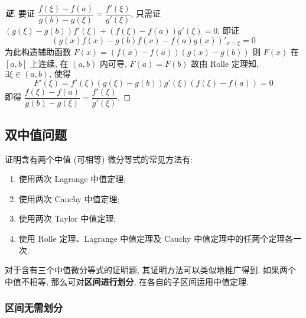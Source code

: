 \begin{proof}[{\songti \textbf{证}}]
    要证 $\dfrac{f(\xi)-f(a)}{g(b)-g(\xi)}=\dfrac{f'(\xi)}{g'(\xi)}$, 只需证 $(g(\xi)-g(b))f'(\xi)+(f(\xi)-f(a))g'(\xi)=0$, 
    即证 $$(g(x)f(x)-g(b)f(x)-f(a)g(x))'_{x=\xi}=0$$
    为此构造辅助函数 $F(x)=(f(x)-f(a))(g(x)-g(b))$ 则 $F(x)$ 在 $[a,b]$ 上连续, 在 $(a,b)$ 内可导, 
    $F(a)=F(b)$ 故由 Rolle 定理知, $\exists\xi\in(a,b)\text{, 使得 }$
    $$F'(\xi)=f'(\xi)(g(\xi)-g(b))g'(\xi)(f(\xi)-f(a))=0$$
    即得 $\dfrac{f(\xi)-f(a)}{g(b)-g(\xi)}=\dfrac{f'(\xi)}{g'(\xi)}.$
\end{proof}

\subsection{双中值问题}

证明含有两个中值 (可相等) 微分等式的常见方法有:
\begin{enumerate}[label=(\arabic{*})]
    \item 使用两次 Lagrange 中值定理;
    \item 使用两次 Cauchy 中值定理;
    \item 使用两次 Taylor 中值定理;
    \item 使用 Rolle 定理、Lagrange 中值定理及 Cauchy 中值定理中的任两个定理各一次.
\end{enumerate}
对于含有三个中值微分等式的证明题, 其证明方法可以类似地推广得到.
如果两个中值不相等, 那么可对\textbf{区间进行划分}, 在各自的子区间运用中值定理.

\subsubsection{区间无需划分}

